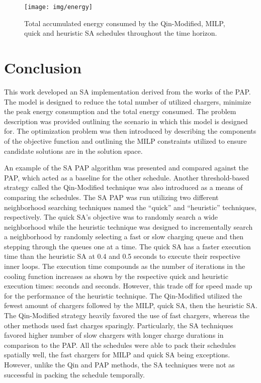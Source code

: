 \documentclass[energies,article,submit,moreauthors]{Definitions/mdpi}
\newcommand{\tempcnt}{3832 }                                                    %
\newcommand{\quicklocal}{0.4 }                                                  %
\newcommand{\heuristiclocal}{0.5 }                                              %
\begin{document}
\begin{figure}[htpb]
\centering \texttt{[image: img/energy]}
    \caption{Total accumulated energy consumed by the Qin-Modified, MILP, quick and heuristic SA schedules throughout the time horizon.}
    \label{fig:energy-usage}
\end{figure}

\section{Conclusion}
\label{sec:sa-conclusion}
This work developed an SA implementation derived from the works of the PAP. The model is designed to reduce the total
number of utilized chargers, minimize the peak energy consumption and the total energy consumed. The problem description
was provided outlining the scenario in which this model is designed for. The optimization problem was then introduced by
describing the components of the objective function and outlining the MILP constraints utilized to ensure candidate
solutions are in the solution space.

An example of the SA PAP algorithm was presented and compared against the PAP, which acted as a baseline for the other
schedule. Another threshold-based strategy called the Qin-Modified technique was also introduced as a means of comparing
the schedules. The SA PAP was run utilizing two different neighborhood searching techniques named the ``quick'' and
``heuristic'' techniques, respectively. The quick SA's objective was to randomly search a wide neighborhood while the
heuristic technique was designed to incrementally search a neighborhood by randomly selecting a fast or slow charging
queue and then stepping through the queues one at a time. The quick SA has a faster execution time than the heuristic SA
at \quicklocal and \heuristiclocal seconds to execute their respective inner loops. The execution
time compounds as the number of iterations in the cooling function increases as shown by the respective quick and
heuristic execution times: \fpeval{\quicklocal * \tempcnt} seconds and \fpeval{\heuristiclocal * \tempcnt} seconds. However, this trade off for speed made up for the performance of the heuristic technique. The
Qin-Modified utilized the fewest amount of chargers followed by the MILP, quick SA, then the heuristic SA. The
Qin-Modified strategy heavily favored the use of fast chargers, whereas the other methods used fast charges sparingly.
Particularly, the SA techniques favored higher number of slow chargers with longer charge durations in comparison to the
PAP. All the schedules were able to pack their schedules spatially well, the fast chargers for MILP and quick SA being
exceptions. However, unlike the Qin and PAP methods, the SA techniques were not as successful in packing the schedule
temporally.
\end{document}
